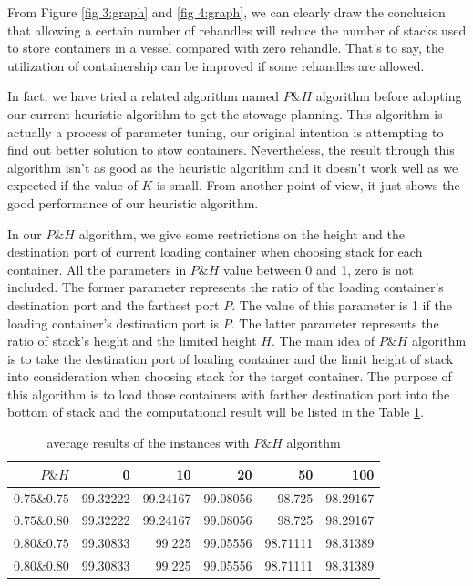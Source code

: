 \documentclass[review,3p,times,authoryear,12pt]{elsarticle}
\begin{document}
From Figure \ref{fig 3:graph} and \ref{fig 4:graph}, we can clearly draw the conclusion that allowing a certain number of rehandles will reduce the number of stacks used to store containers in a vessel compared with zero rehandle.
That's to say, the utilization of containership can be improved if some rehandles are allowed.

In fact, we have tried a related algorithm named $P\&H$ algorithm before adopting our current heuristic algorithm to get the stowage planning.
This algorithm is actually a process of parameter tuning, our original intention is attempting to find out better solution to stow containers.
Nevertheless, the result through this algorithm isn't as good as the heuristic algorithm and it doesn't work well as we expected if the value of $K$ is small.
From another point of view, it just shows the good performance of our heuristic algorithm.

In our $P\&H$ algorithm, we give some restrictions on the height and the destination port of current loading container when choosing stack for each container.
All the parameters in $P\&H$ value between 0 and 1, zero is not included.
The former parameter represents the ratio of the loading container's destination port and the farthest port $P$.
The value of this parameter is 1 if the loading container's destination port is $P$.
The latter parameter represents the ratio of stack's height and the limited height $H$.
The main idea of $P\&H$ algorithm is to take the destination port of loading container and the limit height of stack into consideration when choosing stack for the target container.
The purpose of this algorithm is to load those containers with farther destination port into the bottom of stack and the computational result will be listed in the Table \ref{tab:5}.

\begin{table}[!htbp]
  \centering
  \setlength{\belowcaptionskip}{10pt}
  \caption{average results of the instances with $P\&H$ algorithm}
    \begin{tabular}{r|r|r|r|r|r}
    \hline
     $P\&H$       &0   &10  &20  &50  &100\\
    \hline
    $0.75\&0.75$   &99.32222  &99.24167  &99.08056   &98.725  &98.29167\\
    \hline
    $0.75\&0.80$   &99.32222  &99.24167  &99.08056   &98.725  &98.29167\\
    \hline
    $0.80\&0.75$   &99.30833  &99.225  &99.05556   &98.71111  &98.31389\\
    \hline
    $0.80\&0.80$    &99.30833  &99.225  &99.05556   &98.71111  &98.31389\\
    \hline
    \end{tabular}
  \label{tab:5}
\end{table}
\end{document}
